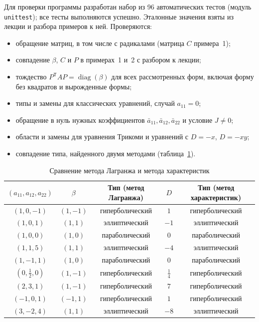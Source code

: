 \documentclass[a4paper,12pt]{article}
\DeclareMathOperator{\diag}{diag}
\begin{document}
Для проверки программы разработан набор из 96 автоматических тестов
(модуль \texttt{unittest}); все тесты выполняются успешно. Эталонные значения
взяты из лекции и разбора примеров к ней. Проверяются:
\begin{itemize}
  \item обращение матриц, в том числе с радикалами (матрица $C$ примера~1);
  \item совпадение $\beta$, $C$ и $P$ в примерах~1 и~2 с разбором к лекции;
  \item тождество $P^{\mathsf T}\!AP=\diag(\beta)$ для всех рассмотренных форм,
        включая форму без квадратов и вырожденные формы;
  \item типы и замены для классических уравнений, случай $a_{11}=0$;
  \item обращение в нуль нужных коэффициентов $\bar a_{11},\bar a_{12},\bar a_{22}$
        и условие $J\neq0$;
  \item области и замены для уравнения Трикоми и уравнений с $D=-x$, $D=-xy$;
  \item совпадение типа, найденного двумя методами (таблица~\ref{tab:agree}).
\end{itemize}

\begin{table}[H]
\centering\small
\renewcommand{\arraystretch}{1.25}
\caption{Сравнение метода Лагранжа и метода характеристик}
\label{tab:agree}
\begin{tabular}{@{}ccccc@{}}
\toprule
$(a_{11},a_{12},a_{22})$ & $\beta$ & Тип (метод Лагранжа) & $D$ & Тип (метод характеристик)\\
\midrule
$(1,0,-1)$       & $(1,-1)$ & гиперболический & $1$            & гиперболический\\
$(1,0,1)$        & $(1,1)$  & эллиптический   & $-1$           & эллиптический\\
$(1,0,0)$        & $(1,0)$  & параболический  & $0$            & параболический\\
$(1,1,5)$        & $(1,1)$  & эллиптический   & $-4$           & эллиптический\\
$(1,-1,1)$       & $(1,0)$  & параболический  & $0$            & параболический\\
$(0,\frac12,0)$  & $(1,-1)$ & гиперболический & $\frac14$      & гиперболический\\
$(2,3,1)$        & $(1,-1)$ & гиперболический & $7$            & гиперболический\\
$(-1,0,1)$       & $(-1,1)$ & гиперболический & $1$            & гиперболический\\
$(3,-2,4)$       & $(1,1)$  & эллиптический   & $-8$           & эллиптический\\
\bottomrule
\end{tabular}
\end{table}
\end{document}
